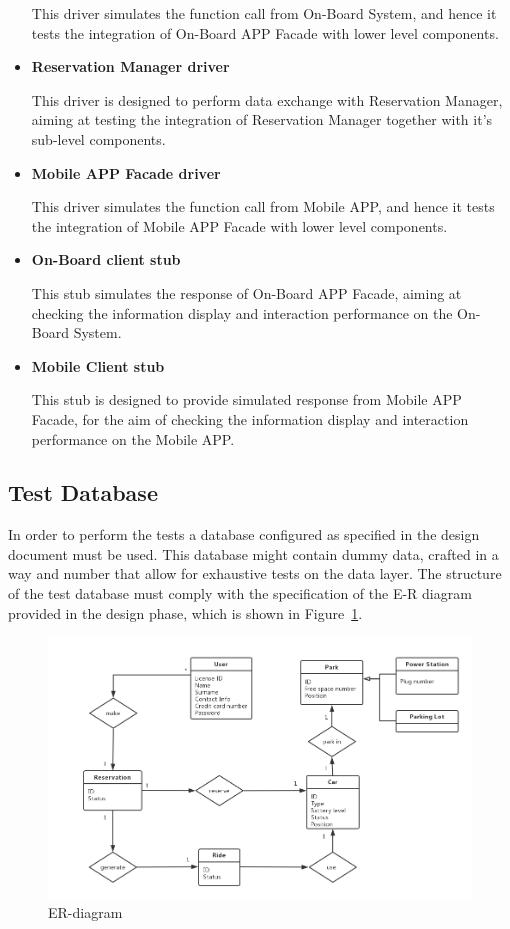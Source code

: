 \documentclass[a4paper,11pt]{article}
\begin{document}
\begin{itemize}
	This driver simulates the function call from On-Board System, and hence it tests the integration of On-Board APP Facade with lower level components. 
	\item \textbf{Reservation Manager driver}
	
	This driver is designed to perform data exchange with Reservation Manager, aiming at testing the integration of Reservation Manager together with it's sub-level components.
	\item \textbf{Mobile APP Facade driver}
	
	This driver simulates the function call from Mobile APP, and hence it tests the integration of Mobile APP Facade with lower level components. 
	\item \textbf{On-Board client stub}
	
	This stub simulates the response of On-Board APP Facade, aiming at checking the information display and interaction performance on the On-Board System.
	\item \textbf{Mobile Client stub}
	
	This stub is designed to provide simulated response from Mobile APP Facade, for the aim of checking the information display and interaction performance on the Mobile APP.
	\end{itemize}
	
	\subsection{Test Database}
	In order to perform the tests a database configured as specified in the design document must be used. This database might contain dummy data, crafted in a way and number that allow for exhaustive tests on the data layer. The structure of the test database must comply with the specification of the E-R diagram provided in the design phase, which is shown in Figure~\ref{fig-ER}.
\begin{figure}[H]
   			\centering
  			\includegraphics[width=\textwidth]{images/ER}
  	    		\caption{ER-diagram}\label{fig-ER}
		\end{figure}
\newpage
\end{document}
